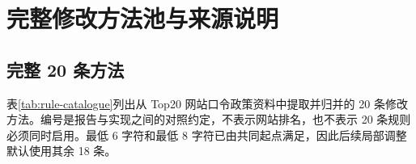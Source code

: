 \documentclass{crypto_report}
\begin{document}
\section{完整修改方法池与来源说明}\label{ux9644ux5f55-a-ux5b8cux6574ux4feeux6539ux65b9ux6cd5ux6c60ux4e0eux6765ux6e90ux8bf4ux660e}

\subsection{完整 20 条方法}\label{a.1-ux5b8cux6574-20-ux6761ux65b9ux6cd5}

表\ref{tab:rule-catalogue}列出从 Top20 网站口令政策资料中提取并归并的 20
条修改方法。编号是报告与实现之间的对照约定，不表示网站排名，也不表示 20
条规则必须同时启用。最低 6 字符和最低 8
字符已由共同起点满足，因此后续局部调整默认使用其余 18 条。
\end{document}
